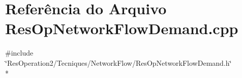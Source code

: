 \section{Referência do Arquivo Res\+Op\+Network\+Flow\+Demand.\+cpp}
\label{_res_op_network_flow_demand_8cpp}
{\ttfamily \#include \char`\"{}Res\+Operation2/\+Tecniques/\+Network\+Flow/\+Res\+Op\+Network\+Flow\+Demand.\+h\char`\"{}}\\*
